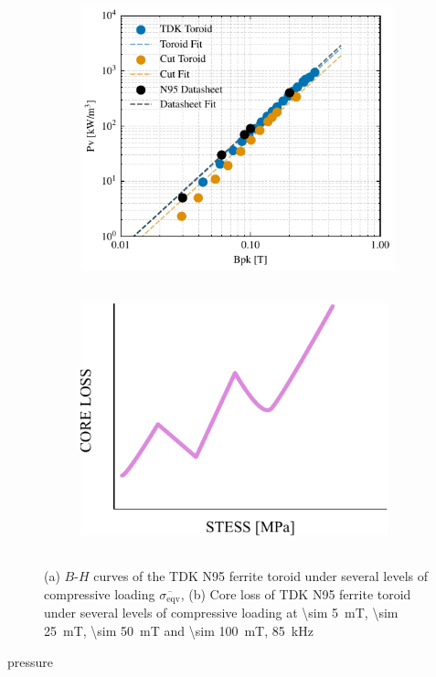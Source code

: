 \documentclass[conference]{IEEEtran}
\begin{document}
\begin{figure}[t]
  \centering
  \begin{subfigure}{\columnwidth}
    \centering
    \includegraphics{figures/24-09-10_BP_curves.pdf}
    \caption{}
    \label{fig:BPcurves}
  \end{subfigure}
  \begin{subfigure}{\columnwidth}
    \centering
    \includegraphics[width=3.5in, height=3in]{figures/coreloss.pdf}
    \caption{}
    \label{fig:corelossstress}
  \end{subfigure}
  \caption{(a) $B$-$H$ curves of the TDK N95 ferrite toroid under several levels of compressive loading $\overline{\sigma_\text{eqv}}$, (b) Core loss of TDK N95 ferrite toroid under several levels of compressive loading at \SI{\sim 5}{\milli\tesla}, \SI{\sim 25}{\milli\tesla}, \SI{\sim 50}{\milli\tesla} and \SI{\sim 100}{\milli\tesla}, \SI{85}{\kilo\hertz}}
\end{figure}
pressure
\end{document}
